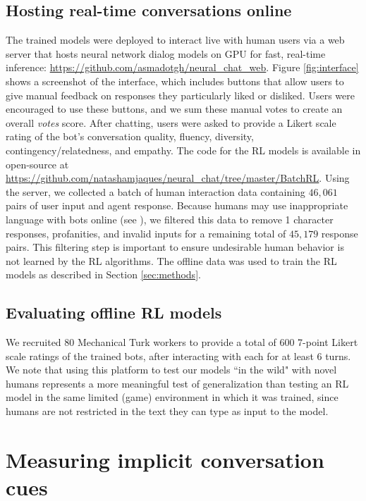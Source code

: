 \subsection{Hosting real-time conversations online}

The trained models were deployed to interact live with human users via a web server that hosts neural network dialog models on GPU for fast, real-time inference: \url{https://github.com/asmadotgh/neural_chat_web}. Figure \ref{fig:interface} shows a screenshot of the interface, which includes buttons that allow users to give manual feedback on responses they particularly liked or disliked. Users were encouraged to use these buttons, and we sum these manual votes to create an overall \textit{votes} score. After chatting, users were asked to provide a Likert scale rating of the bot's conversation quality, fluency, diversity, contingency/relatedness, and empathy. The code for the RL models is available in open-source at \url{https://github.com/natashamjaques/neural_chat/tree/master/BatchRL}. Using the server, we collected a batch of human interaction data containing $46,061$ pairs of user input and agent response. Because humans may use inappropriate language with bots online (see \cite{tay}), we filtered this data to remove 1 character responses, profanities, and invalid inputs for a remaining total of $45,179$ response pairs. This filtering step is important to ensure undesirable human behavior is not learned by the RL algorithms. The offline data was used to train the RL models as described in Section \ref{sec:methods}.

\subsection{Evaluating offline RL models} We recruited 80 Mechanical Turk workers to provide a total of 600 7-point Likert scale ratings of the trained bots, after interacting with each for at least $6$ turns. We note that using this platform to test our models ``in the wild" with novel humans represents a more meaningful test of generalization than testing an RL model in the same limited (game) environment in which it was trained, since humans are not restricted in the text they can type as input to the model.

\section{Measuring implicit conversation cues}
\label{sec:implicit}

